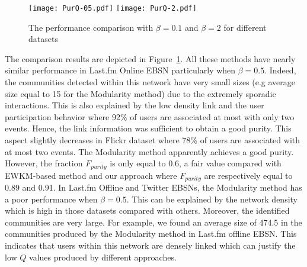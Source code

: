 \begin{figure}[htbp]
  \centering
  \texttt{[image: PurQ-05.pdf]}
   \texttt{[image: PurQ-2.pdf]}
  \caption{The performance comparison with $\beta=0.1$ and $\beta=2$ for different datasets}
  \label{fig:PurQ}
\end{figure}


The comparison results are depicted in Figure~\ref{fig:PurQ}. All these methods have nearly similar performance in Last.fm Online EBSN particularly when $\beta=0.5$. Indeed, the communities detected within this network have very small sizes (e.g average size equal to 15 for the Modularity method) due to the extremely sporadic interactions. This is also explained by the low density link and the user participation behavior where 92\% of users are associated at most with only two events. Hence, the link information was sufficient to obtain a good purity. This aspect slightly decreases in Flickr dataset where 78\% of users are associated with at most two events. The Modularity method apparently achieves a good purity. However, the fraction $F_{purity}$ is only equal to 0.6, a fair value compared with EWKM-based method and our approach where $F_{purity}$ are respectively equal to 0.89 and 0.91. In Last.fm Offline and Twitter EBSNs, the Modularity method has a poor performance when $\beta=0.5$. This can be explained by the network density which is high in those datasets compared with others. Moreover, the identified communities are very large. For example, we found an average size of 474.5 in the communities produced by the Modularity method in Last.fm offline EBSN. This indicates that users within this network are densely linked which can justify the low $Q$ values produced by different approaches. 


